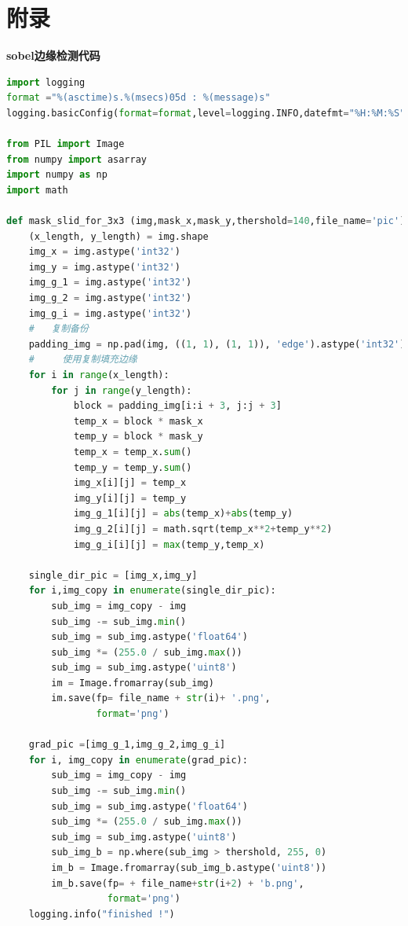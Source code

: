 \documentclass{my_paper}
\begin{document}
\newpage
\begin{center}
\end{center}

\newpage
\section{附录}

\textbf{sobel边缘检测代码}
\begin{lstlisting}[language=python]
    import logging
format ="%(asctime)s.%(msecs)05d : %(message)s"
logging.basicConfig(format=format,level=logging.INFO,datefmt="%H:%M:%S")

from PIL import Image
from numpy import asarray
import numpy as np
import math

def mask_slid_for_3x3 (img,mask_x,mask_y,thershold=140,file_name='pic'):
    (x_length, y_length) = img.shape
    img_x = img.astype('int32')
    img_y = img.astype('int32')
    img_g_1 = img.astype('int32')
    img_g_2 = img.astype('int32')
    img_g_i = img.astype('int32')
    #   复制备份
    padding_img = np.pad(img, ((1, 1), (1, 1)), 'edge').astype('int32')
    #     使用复制填充边缘
    for i in range(x_length):
        for j in range(y_length):
            block = padding_img[i:i + 3, j:j + 3]
            temp_x = block * mask_x
            temp_y = block * mask_y
            temp_x = temp_x.sum()
            temp_y = temp_y.sum()
            img_x[i][j] = temp_x
            img_y[i][j] = temp_y
            img_g_1[i][j] = abs(temp_x)+abs(temp_y)
            img_g_2[i][j] = math.sqrt(temp_x**2+temp_y**2)
            img_g_i[i][j] = max(temp_y,temp_x)

    single_dir_pic = [img_x,img_y]
    for i,img_copy in enumerate(single_dir_pic):
        sub_img = img_copy - img
        sub_img -= sub_img.min()
        sub_img = sub_img.astype('float64')
        sub_img *= (255.0 / sub_img.max())
        sub_img = sub_img.astype('uint8')
        im = Image.fromarray(sub_img)
        im.save(fp= file_name + str(i)+ '.png',
                format='png')

    grad_pic =[img_g_1,img_g_2,img_g_i]
    for i, img_copy in enumerate(grad_pic):
        sub_img = img_copy - img
        sub_img -= sub_img.min()
        sub_img = sub_img.astype('float64')
        sub_img *= (255.0 / sub_img.max())
        sub_img = sub_img.astype('uint8')
        sub_img_b = np.where(sub_img > thershold, 255, 0)
        im_b = Image.fromarray(sub_img_b.astype('uint8'))
        im_b.save(fp= + file_name+str(i+2) + 'b.png',
                  format='png')
    logging.info("finished !")


\end{lstlisting}
\end{document}
